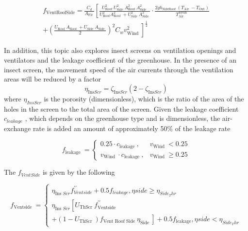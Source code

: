 \begin{equation}
\begin{array}{r}
f_{\text{VentRoofSide}}=\frac{C_{d}}{A_{\text{Flr }}}\left[\frac{U_{\text {Roof }}^{2} U_{\text{Side }}^{2} A_{\text {Roof }}^{2} A_{\text {Side }}^{2}}{U_{\text {Roof}}^{2} A_{\text {Roof }}^{2}+U_{\text {Side }}^{2} A_{\text {Side }}^{2}} \cdot \frac{2 g h_{\text {SideRoof }}\left(T_{\text {Air }}-T_{\text {Out}}\right)}{T_{\text {Air}}^{\text {Mean }}}\right. \\
\left.+\left(\frac{U_{\text {Roof }} A_{\text {Roof }}+U_{\text {Side }} A_{\text {Side }}}{2}\right)^{2} C_{w} v_{\text {Wind }}^{2}\right]^{\frac{1}{2}}
\end{array}
\end{equation}

In addition, this topic also explores insect screens on ventilation openings and ventilators and
the leakage coefficient of the greenhouse. In the presence of an insect screen, the movement speed
of the air currents through the ventilation areas will be reduced by a factor
\begin{equation}
\eta_{\text {Ins} Scr}=\zeta_{\text {Ins}Scr}\left(2-\zeta_{\text {Ins} Scr}\right)
\end{equation}
where $\eta_{InsScr}$ is the porosity (dimensionless), which is the ratio of the area of the holes in the
screen to the total area of the screen. Given the leakage coefficient $c_{leakage}$ , which depends on the
greenhouse type and is dimensionless, the air-exchange rate is added an amount of approximately
50\% of the leakage rate


\begin{equation}
f_{\text {leakage }}=\left\{\begin{array}{ll}
0.25 \cdot c_{\text {leakage }}, & v_{\text {Wind }}<0.25 \\
v_{\text {Wind }} \cdot c_{\text {leakage }}, & v_{\text {Wind }} \geq 0.25
\end{array}\right.
\end{equation}

The $f_{VentSide}$ is given by the following

\begin{equation}
f_{\text {Ventside }}=\left\{\begin{array}{l}
\eta_{\text {Ins } S c r} f_{Ventside}^{\prime \prime}+0.5 f_{leakage}   ,\eta{side} \geq \eta_{Side_Thr}\\
\eta_{\text {Ins } S c r}\left[U_{\text {ThScr }} f_{\text {Ventside }}^{\prime \prime}\right. \\
\left.+\left(1-U_{\text {ThScr }}\right) f_{\text {Vent Roof Side }} \eta_{\text {Side }}\right]+0.5 f_{\text {leakage}}, \eta{side}< \eta_{Side_Thr}
\end{array}\right.
\end{equation}

